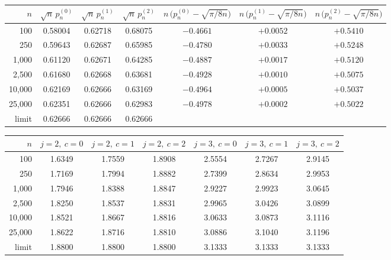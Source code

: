 \begin{tabular}{rcccccc}
\hline
$n$ & $\sqrt{n}\,p_n^{(0)}$ & $\sqrt{n}\,p_n^{(1)}$ & $\sqrt{n}\,p_n^{(2)}$ & $n\,\bigl(p_n^{(0)} - \sqrt{\pi/8n}\bigr)$ & $n\,\bigl(p_n^{(1)} - \sqrt{\pi/8n}\bigr)$ & $n\,\bigl(p_n^{(2)} - \sqrt{\pi/8n}\bigr)$ \\ \hline
100 & 0.58004 & 0.62718 & 0.68075 & $-0.4661$ & $+0.0052$ & $+0.5410$ \\
250 & 0.59643 & 0.62687 & 0.65985 & $-0.4780$ & $+0.0033$ & $+0.5248$ \\
1{,}000 & 0.61120 & 0.62671 & 0.64285 & $-0.4887$ & $+0.0017$ & $+0.5120$ \\
2{,}500 & 0.61680 & 0.62668 & 0.63681 & $-0.4928$ & $+0.0010$ & $+0.5075$ \\
10{,}000 & 0.62169 & 0.62666 & 0.63169 & $-0.4964$ & $+0.0005$ & $+0.5037$ \\
25{,}000 & 0.62351 & 0.62666 & 0.62983 & $-0.4978$ & $+0.0002$ & $+0.5022$ \\
\hline
limit & 0.62666 & 0.62666 & 0.62666 & & & \\ \hline
\end{tabular}

\begin{tabular}{rcccccc}
\hline
$n$ & $j=2,\ c=0$ & $j=2,\ c=1$ & $j=2,\ c=2$ & $j=3,\ c=0$ & $j=3,\ c=1$ & $j=3,\ c=2$ \\ \hline
100 & 1.6349 & 1.7559 & 1.8908 & 2.5554 & 2.7267 & 2.9145 \\
250 & 1.7169 & 1.7994 & 1.8882 & 2.7399 & 2.8634 & 2.9953 \\
1{,}000 & 1.7946 & 1.8388 & 1.8847 & 2.9227 & 2.9923 & 3.0645 \\
2{,}500 & 1.8250 & 1.8537 & 1.8831 & 2.9965 & 3.0426 & 3.0899 \\
10{,}000 & 1.8521 & 1.8667 & 1.8816 & 3.0633 & 3.0873 & 3.1116 \\
25{,}000 & 1.8622 & 1.8716 & 1.8810 & 3.0886 & 3.1040 & 3.1196 \\
\hline
limit & 1.8800 & 1.8800 & 1.8800 & 3.1333 & 3.1333 & 3.1333 \\ \hline
\end{tabular}

